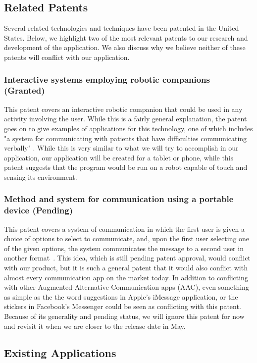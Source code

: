 \subsection{Related Patents}
Several related technologies and techniques have been patented in the United States. Below, we highlight two of the most relevant patents to our research and development of the application. We also discuss why we believe neither of these patents will conflict with our application.

\subsubsection{Interactive systems employing robotic companions (Granted)}
This patent covers an interactive robotic companion that could be used in any activity involving the user. While this is a fairly general explanation, the patent goes on to give examples of applications for this technology, one of which includes "a system for communicating with patients that have difficulties communicating verbally" \cite{stiehl}. While this is very similar to what we will try to accomplish in our application, our application will be created for a tablet or phone, while this patent suggests that the program would be run on a robot capable of touch and sensing its environment.

\subsubsection{Method and system for communication using a portable device (Pending)}
This patent covers a system of communication in which the first user is given a choice of options to select to communicate, and, upon the first user selecting one of the given options, the system communicates the message to a second user in another format~\cite{rashdan}. This idea, which is still pending patent approval, would conflict with our product, but it is such a general patent that it would also conflict with almost every communication app on the market today. In addition to conflicting with other Augmented-Alternative Communication apps (AAC), even something as simple as the the word suggestions in Apple's iMessage application, or the stickers in Facebook's Messenger could be seen as conflicting with this patent. Because of its generality and pending status, we will ignore this patent for now and revisit it when we are closer to the release date in May.

\subsection{Existing Applications}


